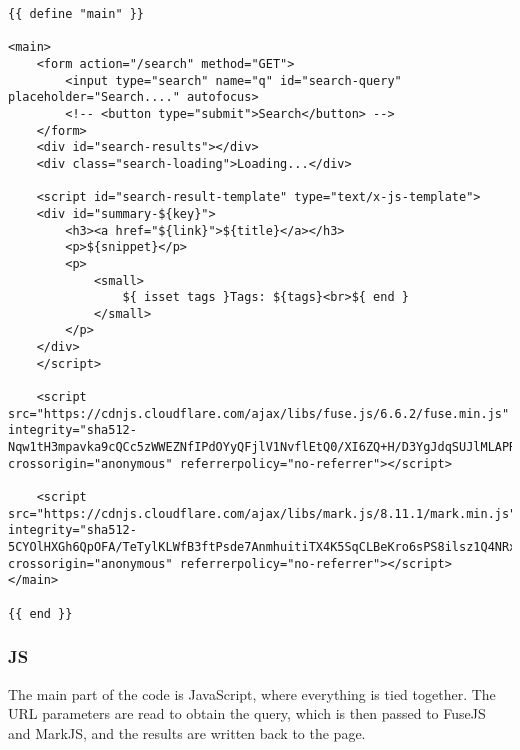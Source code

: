 \documentclass[11pt]{article}
\begin{document}
\begin{verbatim}
{{ define "main" }}

<main>
    <form action="/search" method="GET">
        <input type="search" name="q" id="search-query" placeholder="Search...." autofocus>
        <!-- <button type="submit">Search</button> -->
    </form>
    <div id="search-results"></div>
    <div class="search-loading">Loading...</div>

    <script id="search-result-template" type="text/x-js-template">
    <div id="summary-${key}">
        <h3><a href="${link}">${title}</a></h3>
        <p>${snippet}</p>
        <p>
            <small>
                ${ isset tags }Tags: ${tags}<br>${ end }
            </small>
        </p>
    </div>
    </script>

    <script src="https://cdnjs.cloudflare.com/ajax/libs/fuse.js/6.6.2/fuse.min.js" integrity="sha512-Nqw1tH3mpavka9cQCc5zWWEZNfIPdOYyQFjlV1NvflEtQ0/XI6ZQ+H/D3YgJdqSUJlMLAPRj/oXlaHCFbFCjoQ==" crossorigin="anonymous" referrerpolicy="no-referrer"></script>

    <script src="https://cdnjs.cloudflare.com/ajax/libs/mark.js/8.11.1/mark.min.js" integrity="sha512-5CYOlHXGh6QpOFA/TeTylKLWfB3ftPsde7AnmhuitiTX4K5SqCLBeKro6sPS8ilsz1Q4NRx3v8Ko2IBiszzdww==" crossorigin="anonymous" referrerpolicy="no-referrer"></script>
</main>

{{ end }}
\end{verbatim}
\subsubsection{JS}
\label{sec:org50f026a}
The main part of the code is JavaScript, where everything is tied together. The URL parameters are read to obtain the query, which is then passed to FuseJS and MarkJS, and the results are written back to the page.
\end{document}
